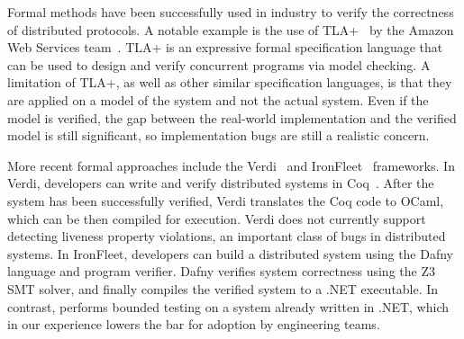 
Formal methods have been successfully used in industry to verify the correctness of distributed protocols. A notable example is the use of TLA+~\cite{lamport1994temporal} by the Amazon Web Services team~\cite{newcombe2015aws}. TLA+ is an expressive formal specification language that can be used to design and verify concurrent programs via model checking. A limitation of TLA+, as well as other similar specification languages, is that they are applied on a model of the system and not the actual system. Even if the model is verified, the gap between the real-world implementation and the verified model is still significant, so implementation bugs are still a realistic concern.

More recent formal approaches include the Verdi~\cite{wilcox2015verdi} and IronFleet~\cite{hawblitzel2015ironfleet} frameworks. In Verdi, developers can write and verify distributed systems in Coq~\cite{barras1997coq}. After the system has been successfully verified, Verdi translates the Coq code to OCaml, which can be then compiled for execution. Verdi does not currently support detecting liveness property violations, an important class of bugs in distributed systems.
In IronFleet, developers can build a distributed system using the Dafny~\cite{leino2010dafny} language and program verifier. Dafny verifies system correctness using the Z3~\cite{de2008z3} SMT solver, and finally compiles the verified system to a .NET executable.
In contrast, \psharp performs bounded testing on a system already written in .NET, which in our experience lowers the bar for adoption by engineering teams.
